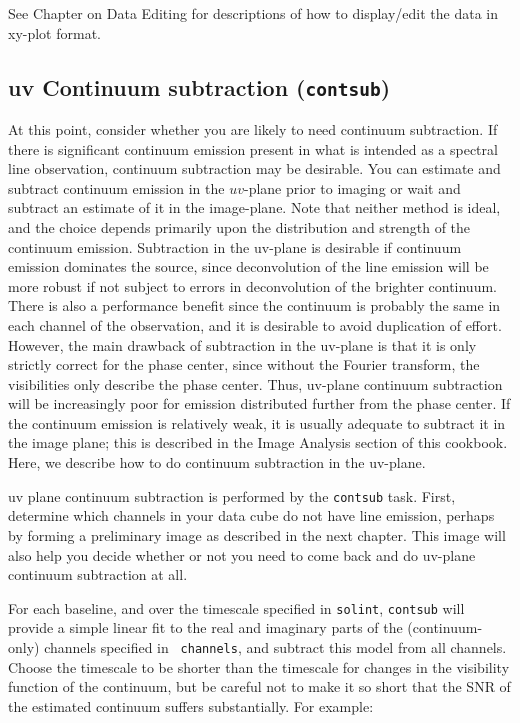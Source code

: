 See Chapter on Data Editing for descriptions of how to display/edit
the data in xy-plot format.

\subsection{uv Continuum subtraction ({\tt contsub})}
\label{subsection:synth.contsub}

At this point, consider whether you are likely to need continuum
subtraction.  If there is significant continuum emission present in
what is intended as a spectral line observation, continuum subtraction
may be desirable.  You can estimate and subtract continuum emission in
the $uv$-plane prior to imaging or wait and subtract an estimate of it
in the image-plane.  Note that neither method is ideal, and the choice
depends primarily upon the distribution and strength of the continuum
emission.  Subtraction in the uv-plane is desirable if continuum
emission dominates the source, since deconvolution of the line
emission will be more robust if not subject to errors in deconvolution
of the brighter continuum.  There is also a performance benefit since
the continuum is probably the same in each channel of the observation,
and it is desirable to avoid duplication of effort.  However, the main
drawback of subtraction in the uv-plane is that it is only strictly
correct for the phase center, since without the Fourier transform, the
visibilities only describe the phase center.  Thus, uv-plane continuum
subtraction will be increasingly poor for emission distributed further
from the phase center.  If the continuum emission is relatively weak,
it is usually adequate to subtract it in the image plane; this is
described in the Image Analysis section of this cookbook.  Here, we
describe how to do continuum subtraction in the uv-plane.

uv plane continuum subtraction is performed by the {\tt contsub} task.
First, determine which channels in your data cube do not have line
emission, perhaps by forming a preliminary image as described in the
next chapter.  This image will also help you decide whether or not you
need to come back and do uv-plane continuum subtraction at all.

For each baseline, and over the timescale specified in {\tt solint},
{\tt contsub} will provide a simple linear fit to the real and
imaginary parts of the (continuum-only) channels specified in {\tt
channels}, and subtract this model from all channels.  Choose the
timescale to be shorter than the timescale for changes in the
visibility function of the continuum, but be careful not to make it so
short that the SNR of the estimated continuum suffers substantially.
For example:

